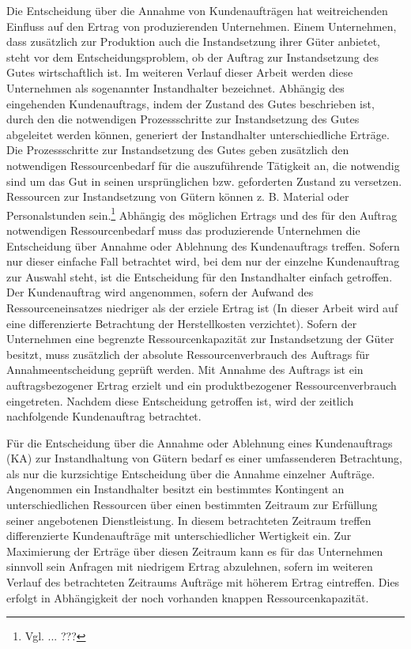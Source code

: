 Die Entscheidung über die Annahme von Kundenaufträgen hat weitreichenden Einfluss auf den Ertrag von produzierenden Unternehmen. Einem Unternehmen, dass zusätzlich zur Produktion auch die Instandsetzung ihrer Güter anbietet, steht vor dem Entscheidungsproblem, ob der Auftrag zur Instandsetzung des Gutes wirtschaftlich ist. Im weiteren Verlauf dieser Arbeit werden diese Unternehmen als sogenannter Instandhalter bezeichnet. Abhängig des eingehenden Kundenauftrags, indem der Zustand des Gutes beschrieben ist, durch den die notwendigen Prozessschritte zur Instandsetzung des Gutes abgeleitet werden können, generiert der Instandhalter unterschiedliche Erträge. Die Prozessschritte zur Instandsetzung des Gutes geben zusätzlich den notwendigen Ressourcenbedarf für die auszuführende Tätigkeit an, die notwendig sind um das Gut in seinen ursprünglichen bzw. geforderten Zustand zu versetzen. Ressourcen zur Instandsetzung von Gütern können z. B. Material oder Personalstunden sein.\footnote{Vgl. ... ???} Abhängig des möglichen Ertrags und des für den Auftrag notwendigen Ressourcenbedarf muss das produzierende Unternehmen die Entscheidung über Annahme oder Ablehnung des Kundenauftrags treffen. Sofern nur dieser einfache Fall betrachtet wird, bei dem nur der einzelne Kundenauftrag zur Auswahl steht, ist die Entscheidung für den Instandhalter einfach getroffen. Der Kundenauftrag wird angenommen, sofern der Aufwand des Ressourceneinsatzes niedriger als der erziele Ertrag ist (In dieser Arbeit wird auf eine differenzierte Betrachtung der Herstellkosten verzichtet).
Sofern der Unternehmen eine begrenzte Ressourcenkapazität zur Instandsetzung der Güter besitzt, muss zusätzlich der absolute Ressourcenverbrauch des Auftrags für Annahmeentscheidung geprüft werden. Mit Annahme des Auftrags ist ein auftragsbezogener Ertrag erzielt und ein produktbezogener Ressourcenverbrauch eingetreten. Nachdem diese Entscheidung getroffen ist, wird der zeitlich nachfolgende Kundenauftrag betrachtet.

Für die Entscheidung über die Annahme oder Ablehnung eines Kundenauftrags (KA) zur Instandhaltung von Gütern bedarf es einer umfassenderen Betrachtung, als nur die kurzsichtige Entscheidung über die Annahme einzelner Aufträge. Angenommen ein Instandhalter besitzt ein bestimmtes Kontingent an unterschiedlichen Ressourcen über einen bestimmten Zeitraum zur Erfüllung seiner angebotenen Dienstleistung. In diesem betrachteten Zeitraum treffen differenzierte Kundenaufträge mit unterschiedlicher Wertigkeit ein. Zur Maximierung der Erträge über diesen Zeitraum kann es für das Unternehmen sinnvoll sein Anfragen mit niedrigem Ertrag abzulehnen, sofern im weiteren Verlauf des betrachteten Zeitraums Aufträge mit höherem Ertrag eintreffen. Dies erfolgt in Abhängigkeit der noch vorhanden knappen Ressourcenkapazität.

